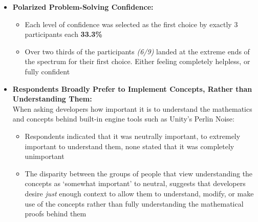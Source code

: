 \begin{itemize}
    \item \textbf{Polarized Problem-Solving Confidence:}
    \begin{itemize}
        \item Each level of confidence was selected as the first choice by exactly 3 participants each \textbf{33.3\%}
        \item Over two thirds of the participants \textit{(6/9)} landed at the extreme ends of the spectrum for their first choice. Either feeling completely helpless, or fully confident
    \end{itemize}

    \item \textbf{Respondents Broadly Prefer to Implement Concepts, Rather than Understanding Them:} \\
    When asking developers how important it is to understand the mathematics and concepts behind built-in engine tools such as Unity's Perlin Noise:
    \begin{itemize}
        \item Respondents indicated that it was neutrally important, to extremely important to understand them, none stated that it was completely unimportant
        \item The disparity between the groups of people that view understanding the concepts as `somewhat important' to neutral, suggests that developers desire
        \textit{just} enough context to allow them to understand, modify, or make use of the concepts rather than fully understanding the mathematical proofs behind them 
    \end{itemize}
\end{itemize}

